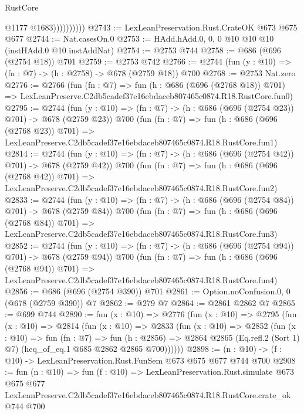 \begin{lexlean}{RustCore}
\begin{coremodule}
                        @1177
                        @1683))))))))))
@2743 := LexLeanPreservation.Rust.CrateOK @673 @675 @677
@2744 := Nat.casesOn.{0}
@2753 := HAdd.hAdd.{0, 0, 0} @10 @10 @10 (instHAdd.{0} @10 instAddNat)
@2754 := @2753 @744
@2758 := @686 (@696 (@2754 @18)) @701
@2759 := @2753 @742
@2766 := @2744 (fun (y : @10) => (fn : @7) -> (h : @2758) -> @678 (@2759 @18)) @700
@2768 := @2753 Nat.zero
@2776 := @2766
    (fun (fn : @7) =>
    fun (h : @686 (@696 (@2768 @18)) @701) =>
    LexLeanPreserve.C2db5cadef37e16ebdaceb807465c0874.R18.RustCore.fun0)
@2795 := @2744
    (fun (y : @10) => (fn : @7) -> (h : @686 (@696 (@2754 @23)) @701) -> @678 (@2759 @23))
    @700
    (fun (fn : @7) =>
    fun (h : @686 (@696 (@2768 @23)) @701) =>
    LexLeanPreserve.C2db5cadef37e16ebdaceb807465c0874.R18.RustCore.fun1)
@2814 := @2744
    (fun (y : @10) => (fn : @7) -> (h : @686 (@696 (@2754 @42)) @701) -> @678 (@2759 @42))
    @700
    (fun (fn : @7) =>
    fun (h : @686 (@696 (@2768 @42)) @701) =>
    LexLeanPreserve.C2db5cadef37e16ebdaceb807465c0874.R18.RustCore.fun2)
@2833 := @2744
    (fun (y : @10) => (fn : @7) -> (h : @686 (@696 (@2754 @84)) @701) -> @678 (@2759 @84))
    @700
    (fun (fn : @7) =>
    fun (h : @686 (@696 (@2768 @84)) @701) =>
    LexLeanPreserve.C2db5cadef37e16ebdaceb807465c0874.R18.RustCore.fun3)
@2852 := @2744
    (fun (y : @10) => (fn : @7) -> (h : @686 (@696 (@2754 @94)) @701) -> @678 (@2759 @94))
    @700
    (fun (fn : @7) =>
    fun (h : @686 (@696 (@2768 @94)) @701) =>
    LexLeanPreserve.C2db5cadef37e16ebdaceb807465c0874.R18.RustCore.fun4)
@2856 := @686 (@696 (@2754 @390)) @701
@2861 := Option.noConfusion.{0, 0} (@678 (@2759 @390)) @7
@2862 := @279 @7
@2864 := @2861 @2862 @7
@2865 := @699 @744
@2890 := fun (x : @10) =>
  @2776
    (fun (x : @10) =>
    @2795
      (fun (x : @10) =>
      @2814
        (fun (x : @10) =>
        @2833
          (fun (x : @10) =>
          @2852
            (fun (x : @10) =>
            fun (fn : @7) =>
            fun (h : @2856) =>
            @2864 @2865 (Eq.refl.{2} (Sort 1) @7) (heq_of_eq.{1} @685 @2862 @2865 @700))))))
@2898 := (n : @10) -> (f : @10) -> LexLeanPreservation.Rust.FunSem @673 @675 @677 @744 @700
@2908 := fun (n : @10) =>
  fun (f : @10) =>
  LexLeanPreservation.Rust.simulate
    @673
    @675
    @677
    LexLeanPreserve.C2db5cadef37e16ebdaceb807465c0874.R18.RustCore.crate_ok
    @744
    @700
\end{coremodule}
\end{lexlean}
